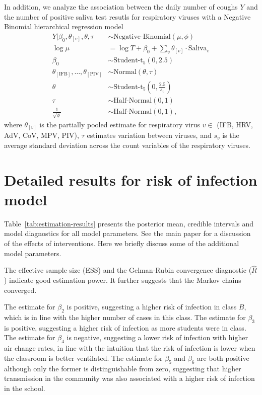 \documentclass[fleqn,11pt]{wlscirep_supp}
\begin{document}
In addition, we analyze the association between the daily number of coughs $Y$ and the number of positive saliva test resutls for respiratory viruses with a Negative Binomial hierarchical regression model
\begin{align*}
    Y | \beta_0, \theta_{[v]}, \theta, \tau &\sim \text{Negative-Binomial}(\mu,\phi) \\
    \log \mu &= \log T + \beta_0 + \sum_v \theta_{[v]} \cdot \text{Saliva}_v \\
    \beta_0 &\sim \text{Student-t}_5(0, 2.5) \\
    \theta_{[\text{IFB}]}, \dots, \theta_{[\text{PIV}]} &\sim \text{Normal}\left(\theta, \tau\right) \\
    \theta &\sim \text{Student-t}_5\left(0, \frac{2.5}{s_{v}}\right) \\
    \tau &\sim \text{Half-Normal}\left(0, 1\right) \\
    \frac{1}{\sqrt{\phi}} &\sim \text{Half-Normal}(0,1),
\end{align*}
where $\theta_{[v]}$ is the partially pooled estimate for respiratory virus $v \in$ (IFB, HRV, AdV, CoV, MPV, PIV), $\tau$ estimates variation between viruses, and $s_v$ is the average standard deviation across the count variables of the respiratory viruses. 

\section{Detailed results for risk of infection model}\label{sec:detailed-redcap}

Table~\ref{tab:estimation-results} presents the posterior mean, credible intervals and model diagnostics for all model parameters. See the main paper for a discussion of the effects of interventions. Here we briefly discuss some of the additional model parameters.

The effective sample size (ESS) and the Gelman-Rubin convergence diagnostic ($\hat{R}$) indicate good estimation power. It further suggests that the Markov chains converged. 

The estimate for $\beta_2$ is positive, suggesting a higher risk of infection in class $B$, which is in line with the higher number of cases in this class. The estimate for $\beta_3$ is positive, suggesting a higher risk of infection as more students were in class. The estimate for $\beta_4$ is negative, suggesting a lower risk of infection with higher air change rates, in line with the intuition that the risk of infection is lower when the classroom is better ventilated. The estimate for $\beta_5$ and $\beta_6$ are both positive although only the former is distinguishable from zero, suggesting that higher transmission in the community was also associated with a higher risk of infection in the school. 
\end{document}

